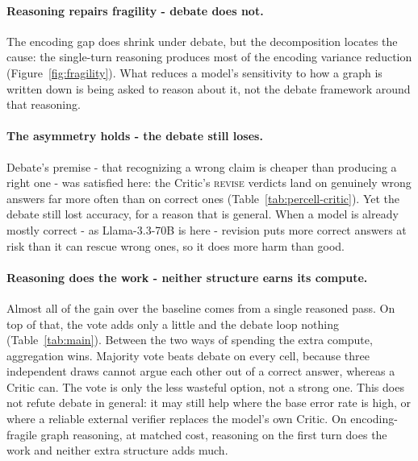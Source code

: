 \documentclass[11pt]{article}
\begin{document}
\paragraph{Reasoning repairs fragility - debate does not.}
The encoding gap does shrink under debate, but the decomposition locates the cause:
the single-turn reasoning produces most of the encoding variance reduction (Figure~\ref{fig:fragility}). What reduces a model's
sensitivity to how a graph is written down is being asked to reason about it, not the
debate framework around that reasoning.

\paragraph{The asymmetry holds - the debate still loses.}
Debate's premise - that recognizing a wrong claim is cheaper than producing a right
one - was satisfied here: the Critic's \textsc{revise} verdicts land on genuinely
wrong answers far more often than on correct ones (Table~\ref{tab:percell-critic}). Yet the debate still lost accuracy,
for a reason that is general. When a model is already mostly correct - as
Llama-3.3-70B is here - revision puts more correct
answers at risk than it can rescue wrong ones, so it does more harm than good.

\paragraph{Reasoning does the work - neither structure earns its compute.}
Almost all of the gain over the baseline comes from a single reasoned pass. On top of
that, the vote adds only a little and the debate loop nothing (Table~\ref{tab:main}).
Between the two ways of spending the extra compute, aggregation wins. Majority vote
beats debate on every cell, because three independent draws cannot argue each other
out of a correct answer, whereas a Critic can. The vote is only the less
wasteful option, not a strong one. This does not refute debate in general: it may
still help where the base error rate is high, or where a reliable external verifier
replaces the model's own Critic. On encoding-fragile graph reasoning, at matched
cost, reasoning on the first turn does the work and neither extra structure adds much.
\end{document}

